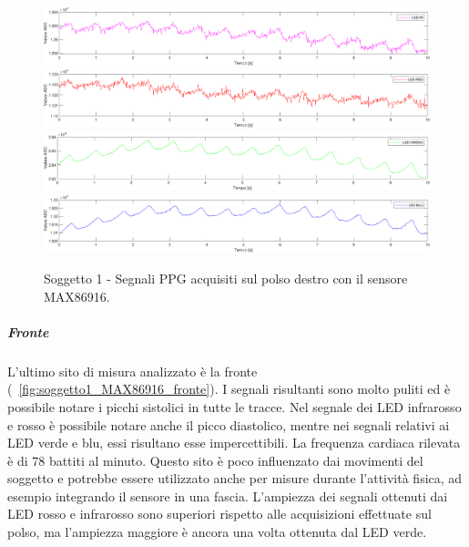 \begin{figure}[h]
	\centering
	\includegraphics[width=1\linewidth]{ImageFiles/Misure Preliminari/Soggetto 1/MAX86916/polso_ired}
	\includegraphics[width=1\linewidth]{ImageFiles/Misure Preliminari/Soggetto 1/MAX86916/polso_red}
	\includegraphics[width=1\linewidth]{ImageFiles/Misure Preliminari/Soggetto 1/MAX86916/polso_green}
	\includegraphics[width=1\linewidth]{ImageFiles/Misure Preliminari/Soggetto 1/MAX86916/polso_blu}
	\caption{Soggetto 1 - Segnali PPG acquisiti sul polso destro con il sensore MAX86916.}
	\label{fig:soggetto1_MAX86916_polso}
\end{figure}

\clearpage

\subparagraph{Fronte}

L'ultimo sito di misura analizzato è la fronte (\Fig~\ref{fig:soggetto1_MAX86916_fronte}). I segnali risultanti sono molto puliti ed è possibile notare i picchi sistolici in tutte le tracce. Nel segnale dei LED infrarosso e rosso è possibile notare anche il picco diastolico, mentre nei segnali relativi ai LED verde e blu, essi risultano esse impercettibili. La frequenza cardiaca rilevata è di 78 battiti al minuto. Questo sito è poco influenzato dai movimenti del soggetto e potrebbe essere utilizzato anche per misure durante l'attività fisica, ad esempio integrando il sensore in una fascia. L'ampiezza dei segnali ottenuti dai LED rosso e infrarosso sono superiori rispetto alle acquisizioni effettuate sul polso, ma l'ampiezza maggiore è ancora una volta ottenuta dal LED verde.

